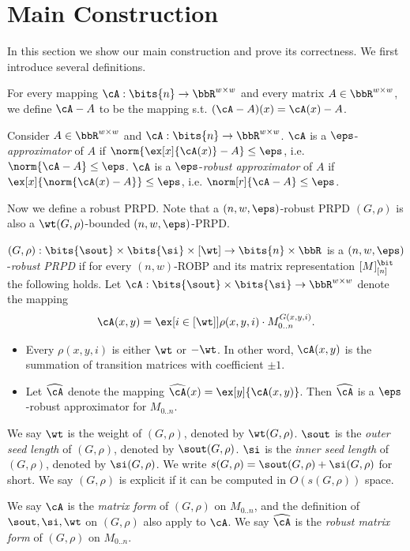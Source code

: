 \section{Main Construction}\label{sec:main-construction}
In this section we show our main construction and prove its correctness. We first introduce several definitions.
\begin{definition}
For every mapping $\cA:\bits{n}\to\bbR^{w\times w}$ and every matrix $A\in\bbR^{w\times w}$, we define $\cA-A$ to be the mapping s.t. $(\cA-A)(x)=\cA(x)-A$.
\end{definition}
\begin{definition}
Consider $A\in\bbR^{w\times w}$ and $\cA:\bits{n}\to\bbR^{w\times w}$. $\cA$ is a $\eps$-\emph{approximator} of $A$ if $\norm{\ex[x]{\cA(x)}-A}\le \eps$, i.e. $\norm{\cA-A}\le \eps$. $\cA$ is a $\eps$-\emph{robust approximator} of $A$ if $\ex[x]{\norm{\cA(x)-A}}\le \eps$, i.e. $\norm[r]{\cA-A}\le \eps$.
\end{definition}
\noindent
Now we define a robust PRPD. Note that a $(n,w,\eps)$-robust PRPD $(G,\rho)$ is also a $\wt(G,\rho)$-bounded $(n,w,\eps)$-PRPD.
\begin{definition}\label{def:robust-PRPD}
$(G,\rho):\bits{\sout}\times\bits{\si}\times{[\wt]}\to\bits{n}\times\bbR$ is a $(n,w,\eps)$-\emph{robust PRPD} if for every $(n,w)$-ROBP and its matrix representation $[M]_{[n]}^{\bit}$ the following holds. Let $\cA:\bits{\sout}\times\bits{\si}\to\bbR^{w\times w}$ denote the mapping 
$$\cA(x,y)=\ex[i\in {[\wt]}]{\rho(x,y,i)\cdot M_{0..n}^{G(x,y,i)}}.$$
\begin{itemize}
\item
Every $\rho(x,y,i)$ is either $\wt$ or $-\wt$. In other word, $\cA(x,y)$ is the summation of transition matrices with coefficient $\pm 1$.
\item
Let $\widehat{\cA}$ denote the mapping $\widehat{\cA}(x)=\ex[y]{\cA(x,y)}$. Then $\widehat{\cA}$ is a $\eps$-robust approximator for $M_{0..n}$. 
\end{itemize}
We say $\wt$ is the weight of $(G,\rho)$, denoted by $\wt(G,\rho)$. $\sout$ is the \emph{outer seed length} of $(G,\rho)$, denoted by $\sout(G,\rho)$. $\si$ is the \emph{inner seed length} of $(G,\rho)$, denoted by $\si(G,\rho)$. We write $s(G,\rho)=\sout(G,\rho)+\si(G,\rho)$ for short. We say $(G,\rho)$ is explicit if it can be computed in $O(s(G,\rho))$ space.

We say $\cA$ is the \emph{matrix form} of $(G,\rho)$ on $M_{0..n}$, and the definition of $\sout,\si,\wt$ on $(G,\rho)$ also apply to $\cA$. We say $\widehat{\cA}$ is the \emph{robust matrix form} of $(G,\rho)$ on $M_{0..n}$. 
\end{definition}

